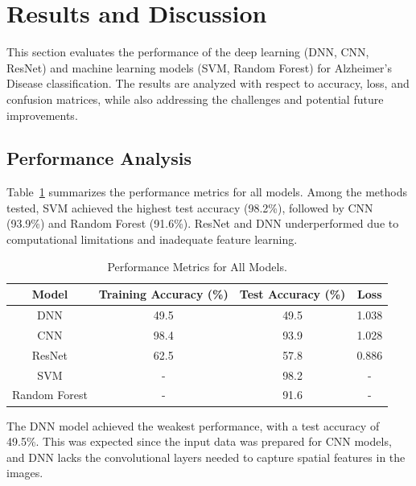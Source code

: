 \documentclass[runningheads]{llncs}
\begin{document}
\section{Results and Discussion}

This section evaluates the performance of the deep learning (DNN, CNN, ResNet) and machine learning models (SVM, Random Forest) for Alzheimer’s Disease classification. The results are analyzed with respect to accuracy, loss, and confusion matrices, while also addressing the challenges and potential future improvements.

\subsection{Performance Analysis}

Table~\ref{tab:performance_metrics} summarizes the performance metrics for all models. Among the methods tested, SVM achieved the highest test accuracy (98.2\%), followed by CNN (93.9\%) and Random Forest (91.6\%). ResNet and DNN underperformed due to computational limitations and inadequate feature learning.

\begin{table}[htbp]
    \centering
    \caption{Performance Metrics for All Models.}
    \label{tab:performance_metrics}
    \begin{tabular}{|c|c|c|c|}
        \hline
        \textbf{Model} & \textbf{Training Accuracy (\%)} & \textbf{Test Accuracy (\%)} & \textbf{Loss} \\
        \hline
        DNN            & 49.5                            & 49.5                        & 1.038         \\
        CNN            & 98.4                            & 93.9                        & 1.028         \\
        ResNet         & 62.5                            & 57.8                        & 0.886         \\
        SVM            & -                               & 98.2                        & -             \\
        Random Forest  & -                               & 91.6                        & -             \\
        \hline
    \end{tabular}
\end{table}

The DNN model achieved the weakest performance, with a test accuracy of 49.5\%. This was expected since the input data was prepared for CNN models, and DNN lacks the convolutional layers needed to capture spatial features in the images.
\end{document}
